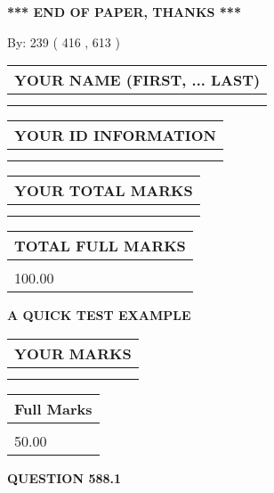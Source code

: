 \documentclass[12pt]{article}
\begin{document}
\vspace{1.0in} 
{\textbf{\large{ *** END OF PAPER, THANKS *** }}} 
   
   
\hspace{1.0in} By: 
 239 ( 416 ,  613 )
   
   
   
   
\newpage 
\setcounter{page}{ 
   588001 } 
   
   
   
   
\noindent\begin{tabular}{|l|}
\hline
YOUR NAME (FIRST, ... LAST)  \\
\hline
 \\ 
 \\ 
\hline
\end{tabular}
\hspace{0.05in} \begin{tabular}{|l|}
\hline
 YOUR   ID   INFORMATION  \\
\hline
 \\ 
 \\ 
\hline
\end{tabular}
   
   
\vspace{0.2in}\noindent\begin{tabular}{|l|}
\hline
YOUR TOTAL MARKS  \\
\hline
 \\ 
 \\ 
\hline
\end{tabular}
\hspace{0.05in} \begin{tabular}{|l|}
\hline
TOTAL FULL MARKS  \\
\hline
 \\ 
100.00 \\
\hline
\end{tabular}
   
   
 \vspace{0.2in}
{\LARGE {\textbf{ A QUICK TEST EXAMPLE}}}
   
   
  
\vspace{0.2in}
  
\noindent\begin{tabular}{|l|}
\hline
 YOUR MARKS  \\
\hline
 \\ 
 \\ 
\hline
\end{tabular}
\hspace{0.05in} \begin{tabular}{|l|}
\hline
 Full Marks  \\
\hline
 \\ 
50.00 \\
\hline
\end{tabular}
{\textbf{\Large{QUESTION
588.1 
}}}
  
\end{document}
